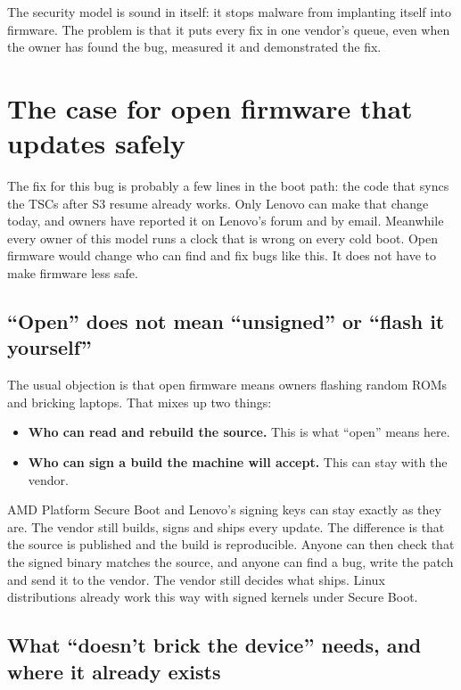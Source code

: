 \documentclass[11pt,a4paper]{article}
\begin{document}
The security model is sound in itself: it stops malware from implanting
itself into firmware. The problem is that it puts every fix in one vendor's
queue, even when the owner has found the bug, measured it and demonstrated
the fix.

\section{The case for open firmware that updates safely}

The fix for this bug is probably a few lines in the boot path: the code that
syncs the TSCs after S3 resume already works. Only Lenovo can make that change
today, and owners have reported it on Lenovo's forum and by email. Meanwhile
every owner of this model runs a clock that is wrong on every cold boot. Open
firmware would change who can find and fix bugs like this. It does not have
to make firmware less safe.

\subsection{``Open'' does not mean ``unsigned'' or ``flash it yourself''}

The usual objection is that open firmware means owners flashing random ROMs
and bricking laptops. That mixes up two things:
\begin{itemize}
\item \textbf{Who can read and rebuild the source.} This is what ``open''
  means here.
\item \textbf{Who can sign a build the machine will accept.} This can stay
  with the vendor.
\end{itemize}

AMD Platform Secure Boot and Lenovo's signing keys can stay exactly as they
are. The vendor still builds, signs and ships every update. The difference is
that the source is published and the build is reproducible. Anyone can then
check that the signed binary matches the source, and anyone can find a bug,
write the patch and send it to the vendor. The vendor still decides what
ships. Linux distributions already work this way with signed kernels under
Secure Boot.

\subsection{What ``doesn't brick the device'' needs, and where it already
exists}
\end{document}
